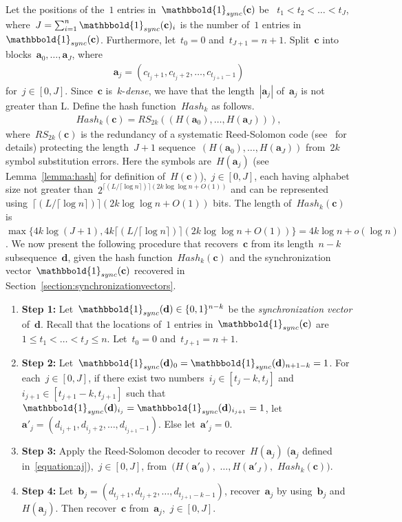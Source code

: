 \documentclass[10pt,a4paper,onecolumn]{IEEEtran}
\newcommand{\1}{\mathbbold{1}}
\newcommand{\bolda}{\mathbf{a}}
\newcommand{\boldb}{\mathbf{b}}
\newcommand{\boldc}{\mathbf{c}}
\newcommand{\boldd}{\mathbf{d}}
\begin{document}
Let the positions of the~$1$ entries in~$\1_{sync}(\boldc)$ be ~$t_1<t_2<\ldots<t_{J}$, where~$J=\sum^n_{i=1}\1_{sync}(\boldc)_i$ is the number of~$1$ entries in ~$\1_{sync}(\boldc)$. Furthermore, let~$t_0=0$ and~$t_{J+1}=n+1$. Split~$\boldc$ into blocks~$\bolda_0,\ldots,\bolda_J$, where
\begin{align}\label{equation:aj}
\bolda_j = (c_{t_j+1},c_{t_j+2},\ldots,c_{t_{j+1}-1})
\end{align}
for~$j\in[0,J]$.
Since~$\boldc$ is~$k$-\emph{dense}, we have that the length~$|\bolda_j|$ of~$\bolda_j$ is not greater than L.
Define the hash function~$Hash_k$ as follows.
\begin{align}\label{equation:hashk}
   Hash_k(\boldc)=RS_{2k}((H(\bolda_0),\ldots,H(\bolda_J))), 
\end{align}
where~$RS_{2k}(\boldc)$ is the redundancy of a systematic Reed-Solomon code (see~\cite{Gao} for details) protecting the length~$J+1$ sequence~$(H(\bolda_0),\ldots,H(\bolda_J))$ from~$2k$ symbol substitution errors. Here the symbols are~$H(\bolda_j)$ (see Lemma~\ref{lemma:hash} for definition of~$H(\boldc)$),~$j\in [0,J]$, each having alphabet size not greater than~$2^{\lceil (L/\lceil \log n \rceil)\rceil (2k\log\log n+O(1))}$ and can be represented using~$\lceil (L/\lceil \log n \rceil)\rceil (2k\log\log n+O(1))$ bits. The length of~$Hash_k(\boldc)$ is~$\max \{4k\log (J+1),4k\lceil (L/\lceil \log n \rceil)\rceil (2k\log\log n+O(1))\}=4k\log n +o(\log n)$.
We now present the following procedure that recovers~$\boldc$ from its length~$n-k$ subsequence~$\boldd$, given the hash function~$Hash_k(\boldc)$ and the synchronization vector~$\1_{sync}(\boldc)$ recovered in Section~\ref{section:synchronizationvectors}. 
\begin{enumerate}
    \item \textbf{Step 1:} Let~$\1_{sync}(\boldd)\in\{0,1\}^{n-k}$ be the \emph{synchronization vector} of~$\boldd$.
    Recall that the locations of~$1$ entries in~$\1_{sync}(\boldc)$ are~$1\le t_1<\ldots<t_J\le n$. Let~$t_0=0$ and~$t_{J+1}=n+1$.
    \item \textbf{Step 2:} Let~$\1_{sync}(\boldd)_0=\1_{sync}(\boldd)_{n+1-k}=1$. For each~$j\in [0,J]$, if there exist two numbers~$i_j\in [t_j-k,t_j]$ and~$i_{j+1}\in [t_{j+1}-k,t_{j+1}]$ such that~$\1_{sync}(\boldd)_{i_{j}}=\1_{sync}(\boldd)_{i_{j+1}}=1$,  let~$\bolda'_j=(d_{i_j+1},d_{i_j+2},\ldots,
    d_{i_{j+1}-1})$. Else let~$\bolda'_j=0$.
    \item \textbf{Step 3:} Apply the Reed-Solomon decoder to recover~$H(\bolda_j)$ ($\bolda_j$ defined in~\eqref{equation:aj}),~$j\in [0,J]$,  from~$(H(\bolda'_0),$ $\ldots,H(\bolda'_J),$ $Hash_k(\boldc))$.
    \item \textbf{Step 4:} Let~$\boldb_j=(d_{t_j+1},d_{t_{j}+2},\ldots,d_{t_{j+1}-k-1})$, recover~$\bolda_j$ by using~$\boldb_j$ and~$H(\bolda_j)$. Then recover~$\boldc$ from~$\bolda_j$,~$j\in[0,J]$.
\end{enumerate}
\end{document}
